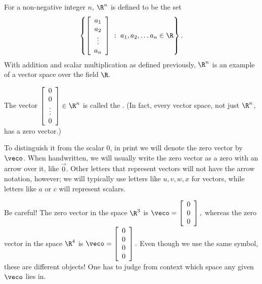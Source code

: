 

\endedxproblem






\endedxvertical




{} 
For a non-negative integer $n$, $\R^n$ is defined to be the set 
\[
\left\{\left[\begin{array}{c} a_1 \\ a_2 \\ \vdots \\ a_n
\end{array} \right] \ : \ a_1, a_2, \ldots a_n \in \R \right\}. \]  
With addition and scalar multiplication as defined previously, 
$\R^n$ is an example of a vector
space over the field $\R.$  


\endedxtext




The vector $\left[\begin{array}{c} 0 \\ 0 \\ \vdots \\ 0
\end{array} \right] \in \R^n$ is called the {}.  (In fact,
every vector space, not just $\R^n$, has a zero vector.)  

To distinguish it from the scalar 0, in print we will denote the zero vector
by $\veco$.  When handwritten, we will usually write the zero vector as a 
zero with an arrow over it, like $\vec{0}$.  Other letters that represent vectors will
not have the arrow notation, however; we will typically use letters like $u,v,w,x$ for 
vectors, while letters like $a$ or $c$ will represent scalars.  

  
Be careful!  The zero vector in the space $\R^3$ is 
$\veco  = \left[\begin{array}{c} 0 \\ 0 \\  0
\end{array} \right],$ whereas the zero vector in the space 
$\R^4$ is 
$\veco  = \left[\begin{array}{c} 0 \\ 0 \\ 0 \\  0
\end{array} \right].$  Even though we use the same symbol, these are different objects!  
One has to judge from context which space any given $\veco$ lies in.  
 
